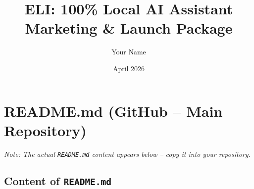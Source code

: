 \documentclass[11pt,a4paper]{article}
\title{\Huge \textbf{ELI: 100\% Local AI Assistant} \\ \large Marketing \& Launch Package}
\author{Your Name}
\date{April 2026}
\begin{document}
\maketitle
\tableofcontents
\newpage

\section{README.md (GitHub – Main Repository)}
\label{sec:readme}
\begin{tcolorbox}[colback=gray!5, colframe=black, title={\texttt{README.md}}]

\end{tcolorbox}
\emph{Note: The actual \texttt{README.md} content appears below – copy it into your repository.}

\subsection{Content of \texttt{README.md}}


\end{document}
